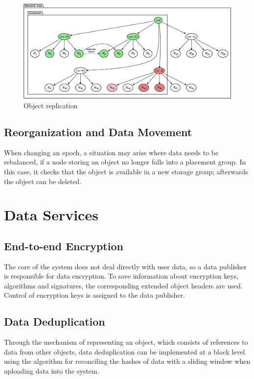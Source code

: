 \documentclass[a4paper, 11pt]{article}
\begin{document}
\begin{figure}[!h]
\centering
\includegraphics[scale=.5]{pic/uml_9_rebalance_4.eps}
\caption{ Object replication }
\end{figure}

\FloatBarrier 

\subsection{Reorganization and Data Movement }

When changing an epoch, a situation may arise where data needs to be
rebalanced, if a node storing an object no longer falls into a placement
group. In this case, it checks that the object is available in a new storage
group; afterwards the object can be deleted.

\section{Data Services}
\subsection{End-to-end Encryption}

The core of the system does not deal directly with user data, so a data
publisher is responsible for data encryption. To save information about
encryption keys, algorithms and signatures, the corresponding extended object
headers are used. Control of encryption keys is assigned to the data publisher.

\subsection{Data Deduplication}

Through the mechanism of representing an object, which consists of references
to data from other objects, data deduplication can be
implemented at a block level using the algorithm for reconciling the hashes
of data with a sliding window when uploading data into the system.
\end{document}
